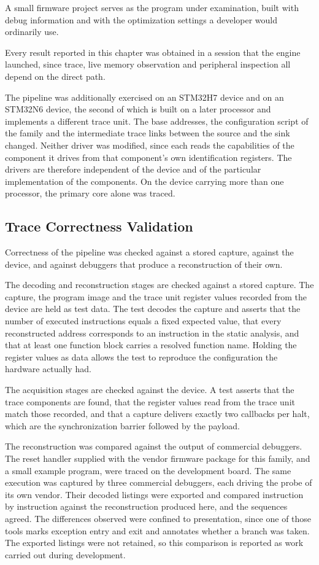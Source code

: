 A small firmware project serves as the program under examination, built with debug information and with the optimization settings a developer would ordinarily use.

Every result reported in this chapter was obtained in a session that the engine launched, since trace, live memory observation and peripheral inspection all depend on the direct path.

The pipeline was additionally exercised on an STM32H7 device and on an STM32N6 device, the second of which is built on a later processor and implements a different trace unit. The base addresses, the configuration script of the family and the intermediate trace links between the source and the sink changed. Neither driver was modified, since each reads the capabilities of the component it drives from that component's own identification registers. The drivers are therefore independent of the device and of the particular implementation of the components. On the device carrying more than one processor, the primary core alone was traced.

\subsection{Trace Correctness Validation}
\label{subsec:trace_validation}
Correctness of the pipeline was checked against a stored capture, against the device, and against debuggers that produce a reconstruction of their own.

The decoding and reconstruction stages are checked against a stored capture. The capture, the program image and the trace unit register values recorded from the device are held as test data. The test decodes the capture and asserts that the number of executed instructions equals a fixed expected value, that every reconstructed address corresponds to an instruction in the static analysis, and that at least one function block carries a resolved function name. Holding the register values as data allows the test to reproduce the configuration the hardware actually had.

The acquisition stages are checked against the device. A test asserts that the trace components are found, that the register values read from the trace unit match those recorded, and that a capture delivers exactly two callbacks per halt, which are the synchronization barrier followed by the payload.

The reconstruction was compared against the output of commercial debuggers. The reset handler supplied with the vendor firmware package for this family, and a small example program, were traced on the development board. The same execution was captured by three commercial debuggers, each driving the probe of its own vendor. Their decoded listings were exported and compared instruction by instruction against the reconstruction produced here, and the sequences agreed. The differences observed were confined to presentation, since one of those tools marks exception entry and exit and annotates whether a branch was taken. The exported listings were not retained, so this comparison is reported as work carried out during development.

